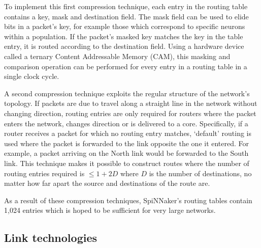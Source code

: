 			To implement this first compression technique, each entry in the routing
			table contains a key, mask and destination field. The mask field can be
			used to elide bits in a packet's key, for example those which correspond
			to specific neurons within a population. If the packet's masked key
			matches the key in the table entry, it is routed according to the
			destination field. Using a hardware device called a ternary Content
			Addressable Memory (CAM), this masking and comparison operation can be
			performed for every entry in a routing table in a single clock cycle.
			
			A second compression technique exploits the regular structure of the
			network's topology. If packets are due to travel along a straight line in
			the network without changing direction, routing entries are only required
			for routers where the packet enters the network, changes direction or is
			delivered to a core. Specifically, if a router receives a packet for which
			no routing entry matches, `default' routing is used where the packet is
			forwarded to the link opposite the one it entered. For example, a packet
			arriving on the North link would be forwarded to the South link. This
			technique makes it possible to construct routes where the number of
			routing entries required is $\le 1 + 2D$ where $D$ is the number of
			destinations, no matter how far apart the source and destinations of the
			route are.
			
			As a result of these compression techniques, SpiNNaker's routing tables
			contain 1,024 entries which is hoped to be sufficient for very large
			networks.
		
		\subsection{Link technologies}
			
			
